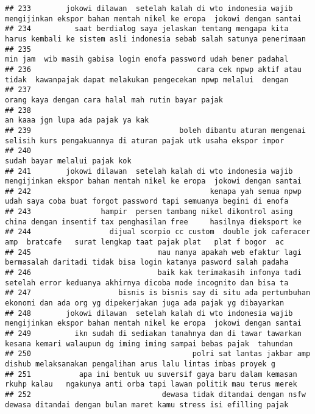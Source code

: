 \documentclass[
]{article}
\begin{document}
\begin{verbatim}
## 233        jokowi dilawan  setelah kalah di wto indonesia wajib mengijinkan ekspor bahan mentah nikel ke eropa  jokowi dengan santai
## 234          saat berdialog saya jelaskan tentang mengapa kita harus kembali ke sistem asli indonesia sebab salah satunya penerimaan
## 235                                                                min jam  wib masih gabisa login enofa password udah bener padahal
## 236                                      cara cek npwp aktif atau tidak  kawanpajak dapat melakukan pengecekan npwp melalui  dengan 
## 237                                                                               orang kaya dengan cara halal mah rutin bayar pajak
## 238                                                                                                an kaaa jgn lupa ada pajak ya kak
## 239                                  boleh dibantu aturan mengenai selisih kurs pengakuannya di aturan pajak utk usaha ekspor impor 
## 240                                                                                                    sudah bayar melalui pajak kok
## 241        jokowi dilawan  setelah kalah di wto indonesia wajib mengijinkan ekspor bahan mentah nikel ke eropa  jokowi dengan santai
## 242                                         kenapa yah semua npwp udah saya coba buat forgot password tapi semuanya begini di enofa 
## 243                hampir  persen tambang nikel dikontrol asing china dengan insentif tax penghasilan free     hasilnya dieksport ke
## 244                  dijual scorpio cc custom  double jok caferacer amp  bratcafe   surat lengkap taat pajak plat   plat f bogor  ac
## 245                             mau nanya apakah web efaktur lagi bermasalah daritadi tidak bisa login katanya pasword salah padaha 
## 246                             baik kak terimakasih infonya tadi setelah error keduanya akhirnya dicoba mode incognito dan bisa ta 
## 247                    bisnis is bisnis say di situ ada pertumbuhan ekonomi dan ada org yg dipekerjakan juga ada pajak yg dibayarkan
## 248        jokowi dilawan  setelah kalah di wto indonesia wajib mengijinkan ekspor bahan mentah nikel ke eropa  jokowi dengan santai
## 249          ikn sudah di sediakan tanahnya dan di tawar tawarkan kesana kemari walaupun dg iming iming sampai bebas pajak  tahundan
## 250                                     polri sat lantas jakbar amp  dishub melaksanakan pengalihan arus lalu lintas imbas proyek g 
## 251           apa ini bentuk uu suversif gaya baru dalam kemasan rkuhp kalau   ngakunya anti orba tapi lawan politik mau terus merek
## 252                              dewasa tidak ditandai dengan nsfw dewasa ditandai dengan bulan maret kamu stress isi efilling pajak

\end{verbatim}
\end{document}
